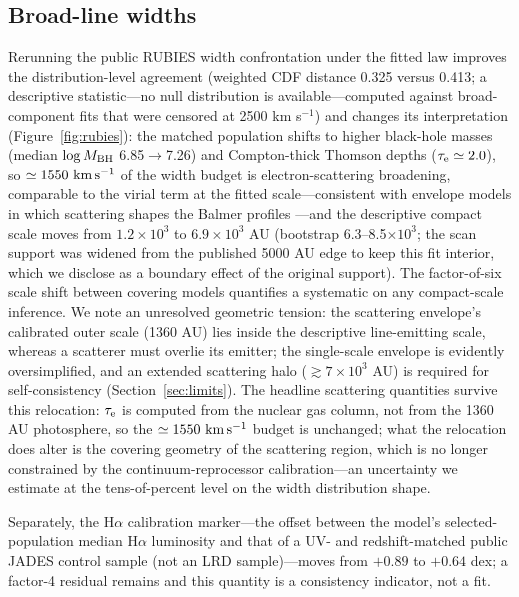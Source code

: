 \documentclass[twocolumn]{aastex631}
\begin{document}
\subsection{Broad-line widths}\label{sec:widths}
Rerunning the public RUBIES width confrontation \citep{Hviding2025} under
the fitted law improves the distribution-level agreement (weighted CDF
distance 0.325 versus 0.413; a descriptive statistic---no null
distribution is available---computed against broad-component fits that
were censored at 2500 km s$^{-1}$) and changes its interpretation
(Figure~\ref{fig:rubies}): the matched population shifts to higher
black-hole masses (median $\log M_{\rm BH}$ 6.85$\rightarrow$7.26) and
Compton-thick Thomson depths ($\tau_{\rm e}\simeq2.0$), so
$\simeq1550~{\rm km\,s^{-1}}$ of the width budget is electron-scattering
broadening, comparable to the virial term at the fitted
scale---consistent with envelope models in which scattering shapes
the Balmer profiles \citep{Naidu2025,deGraaff2025}---and the descriptive
compact scale moves from $1.2\times10^{3}$ to $6.9\times10^{3}$ AU
(bootstrap 6.3--8.5$\times10^{3}$; the scan support was widened from the
published 5000 AU edge to keep this fit interior, which we disclose as a
boundary effect of the original support). The factor-of-six scale shift
between covering models quantifies a systematic on any compact-scale
inference. We note an unresolved geometric tension: the scattering
envelope's calibrated outer scale (1360 AU) lies inside the descriptive
line-emitting scale, whereas a scatterer must overlie its emitter; the
single-scale envelope is evidently oversimplified, and an extended
scattering halo ($\gtrsim7\times10^{3}$ AU) is required for
self-consistency (Section~\ref{sec:limits}). The headline scattering
quantities survive this relocation: $\tau_{\rm e}$ is computed from the
nuclear gas column, not from the 1360 AU photosphere, so the
$\simeq1550~{\rm km\,s^{-1}}$ budget is unchanged; what the relocation
does alter is the covering geometry of the scattering region, which is no
longer constrained by the continuum-reprocessor calibration---an
uncertainty we estimate at the tens-of-percent level on the width
distribution shape.

Separately, the H$\alpha$ calibration marker---the offset between the
model's selected-population median H$\alpha$ luminosity and that of a
UV- and redshift-matched public JADES control sample (not an LRD
sample)---moves from $+0.89$ to $+0.64$ dex; a factor-4 residual remains
and this quantity is a consistency indicator, not a fit.
\end{document}
